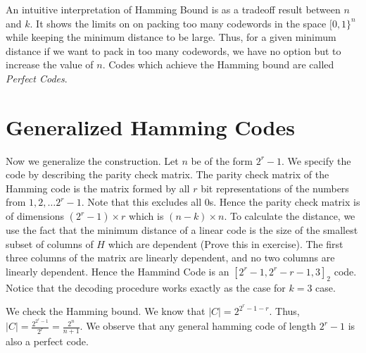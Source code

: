 An intuitive interpretation of Hamming Bound is as a tradeoff result between $n$ and $k$. It shows the limits on on packing too many codewords in the space $[0,1\}^n$ while keeping the minimum distance to be large. Thus, for a given minimum distance if we want to pack in too many codewords, we have no option but to increase the value of $n$. Codes which achieve the Hamming bound are called \textit{Perfect Codes}.

\section{Generalized Hamming Codes}

Now we generalize the construction. Let $n$ be of the form $2^r-1$. We specify the code by describing the parity check matrix. The parity check matrix of the Hamming code is the matrix formed by all $r$ bit representations of the numbers from $1, 2, \ldots 2^r-1$. Note that this excludes all 0s. Hence the parity check matrix is of dimensions $(2^r-1) \times r$ which is $(n-k) \times n$. To calculate the distance, we use the fact that the minimum distance of a linear code is the size of the smallest subset of columns of $H$ which are dependent (Prove this in exercise). The first three columns of the matrix are linearly dependent, and no two columns are linearly dependent. Hence the Hammind Code is an $[2^r-1, 2^r-r-1, 3]_2$ code. Notice that the decoding procedure works exactly as the case for $k=3$ case.

We check the Hamming bound. We know that $|C| = 2^{2^r-1-r}$.
Thus, $|C| = \frac{2^{2^r-1}}{2^r} = \frac{2^n}{n+1}$. We observe that any general hamming code of length $2^r-1$ is also a perfect code. 

